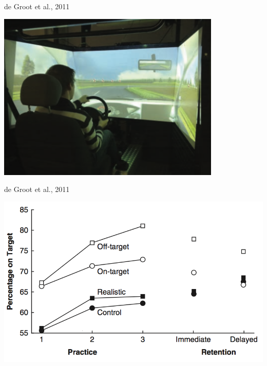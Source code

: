 \documentclass[10pt]{beamer}
\begin{document}


\begin{frame}[fragile]{de Groot et al., 2011~\cite{DeGroot2011}}
  \begin{center}
    \includegraphics[width=0.8\textwidth]{../img/degrootdriving.png}
  \end{center}
\end{frame}

\begin{frame}[fragile]{de Groot et al., 2011~\cite{DeGroot2011}}
  \begin{center}
    \includegraphics[width=\textwidth]{../img/degrootresults.png}
  \end{center}
\end{frame}
\end{document}
